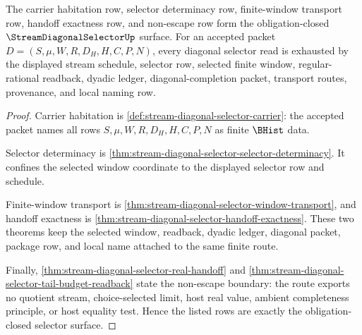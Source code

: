 \begin{theorem}
\label{thm:stream-diagonal-selector-obligation-closure}
The carrier habitation row, selector determinacy row, finite-window transport row, handoff exactness row, and non-escape row form the obligation-closed $\StreamDiagonalSelectorUp$ surface. For an accepted packet $D=(S,\mu,W,R,D_H,H,C,P,N)$, every diagonal selector read is exhausted by the displayed stream schedule, selector row, selected finite window, regular-rational readback, dyadic ledger, diagonal-completion packet, transport routes, provenance, and local naming row.
\end{theorem}
\begin{proof}
Carrier habitation is \autoref{def:stream-diagonal-selector-carrier}: the accepted packet names all rows $S,\mu,W,R,D_H,H,C,P,N$ as finite $\BHist$ data.

Selector determinacy is \autoref{thm:stream-diagonal-selector-selector-determinacy}. It confines the selected window coordinate to the displayed selector row and schedule.

Finite-window transport is \autoref{thm:stream-diagonal-selector-window-transport}, and handoff exactness is \autoref{thm:stream-diagonal-selector-handoff-exactness}. These two theorems keep the selected window, readback, dyadic ledger, diagonal packet, package row, and local name attached to the same finite route.

Finally, \autoref{thm:stream-diagonal-selector-real-handoff} and \autoref{thm:stream-diagonal-selector-tail-budget-readback} state the non-escape boundary: the route exports no quotient stream, choice-selected limit, host real value, ambient completeness principle, or host equality test. Hence the listed rows are exactly the obligation-closed selector surface.
\end{proof}

